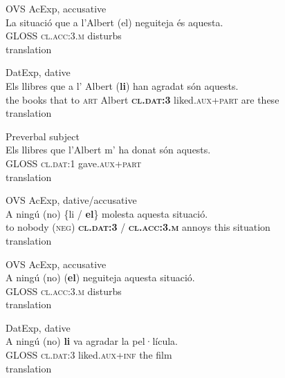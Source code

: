 \documentclass[output=paper,modfonts,nonflat,newtxmath]{langsci/langscibook}
\begin{document}
 \ex OVS AcExp, {accusative}\label{ex:royo:10b}\\
 \gll La  situació  que a  l’Albert (el) neguiteja és aquesta.\\
  GLOSS \textsc{cl.acc}:3.\textsc{m} disturbs \\
 \glt  translation
  
 \ex  DatExp, {dative} \label{ex:royo:10c}\\
 \gll Els llibres que a l’ Albert (\textbf{li}) han agradat són aquests.\\
  the books that to \textsc{art} Albert \textbf{\textsc{cl.dat:3}} liked.\textsc{aux+part} are these\\
 \glt  translation
 
  
 
  
 \ex  Preverbal subject\label{ex:royo:10e}\\
 \gll  Els llibres que l’Albert m’ ha donat són aquests.\\
	 	GLOSS \textsc{cl.dat:1} gave.\textsc{aux+part} \\
 \glt  translation
 
 \z
 \z
 

\ea%
 \label{ex:royo:11}
 \ea OVS AcExp, {dative/accusative}\label{ex:royo:11a}\\
 \gll  A ningú (no) \{{li} / \textbf{el}\} molesta aquesta situació.\\
    to nobody (\textsc{neg}) \textbf{\textsc{cl.dat:3}} / \textbf{\textsc{cl.acc:3.m}} annoys this situation \\
 \glt translation
 
 
 \ex OVS AcExp, {accusative} \label{ex:royo:11b}\\
 \gll A ningú (no) (\textbf{el}) neguiteja aquesta situació.\\
  	GLOSS \textsc{cl.acc:3.m} disturbs\\ 
 \glt translation
 
 \ex  DatExp, {dative} \label{ex:royo:11c}\\
 \gll  A ningú (no) \textbf{li} va agradar la pel·lícula. \\
 GLOSS \textsc{cl.dat:3} liked.\textsc{aux+inf} the film\\
 \glt translation
\end{document}
